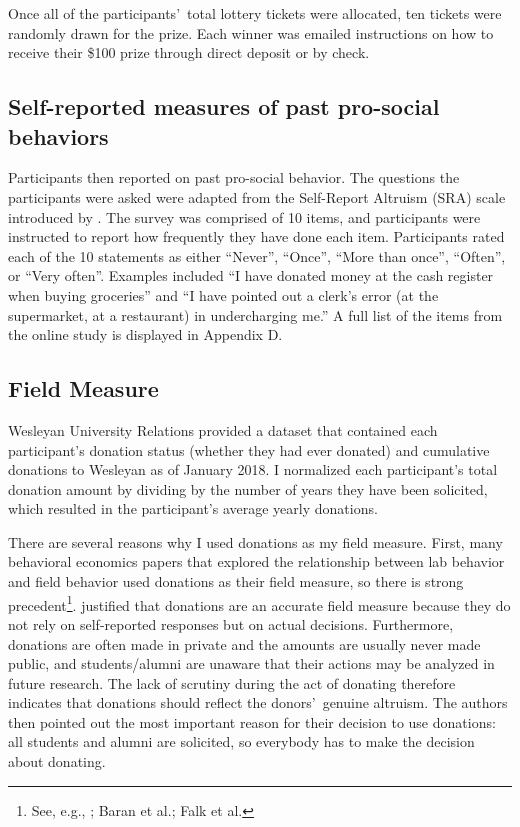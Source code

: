 \documentclass[12pt]{article}
\begin{document}
Once all of the participants\rq \ total lottery tickets were allocated, ten tickets were randomly drawn for the prize. Each winner was emailed instructions on how to receive their \$100 prize through direct deposit or by check. 

\subsection{Self-reported measures of past pro-social behaviors}

Participants then reported on past pro-social behavior. The questions the participants were asked were adapted from the Self-Report Altruism (SRA) scale introduced by \cite{rushton_chrisjohn_fekken_1981}. The survey was comprised of 10 items, and participants were instructed to report how frequently they have done each item. Participants rated each of the 10 statements as either ``Never'', ``Once'', ``More than once'', ``Often'', or ``Very often''. Examples included ``I have donated money at the cash register when buying groceries'' and ``I have pointed out a clerk\rq s error (at the supermarket, at a restaurant) in undercharging me.'' A full list of the items from the online study is displayed in Appendix D. 

\subsection{Field Measure}

Wesleyan University Relations provided a dataset that contained each participant\rq s donation status (whether they had ever donated) and cumulative donations to Wesleyan as of January 2018. I normalized each participant\rq s total donation amount by dividing by the number of years they have been solicited, which resulted in the participant\rq s average yearly donations.

There are several reasons why I used donations as my field measure. First, many behavioral economics papers that explored the relationship between lab behavior and field behavior used donations as their field measure, so there is strong precedent\footnote{See, e.g., \cite{benz_meier_2006}; Baran et al.; Falk et al.}. \cite{falk_2013} justified that donations are an accurate field measure because they do not rely on self-reported responses but on actual decisions. Furthermore, donations are often made in private and the amounts are usually never made public, and students/alumni are unaware that their actions may be analyzed in future research. The lack of scrutiny during the act of donating therefore indicates that donations should reflect the donors\rq \ genuine altruism. The authors then pointed out the most important reason for their decision to use donations: all students and alumni are solicited, so everybody has to make the decision about donating.
\end{document}
